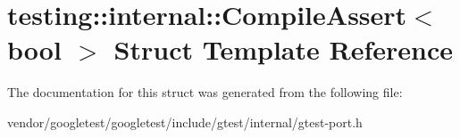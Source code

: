 \hypertarget{structtesting_1_1internal_1_1_compile_assert}{}\section{testing\+:\+:internal\+:\+:Compile\+Assert$<$ bool $>$ Struct Template Reference}
\label{structtesting_1_1internal_1_1_compile_assert}


The documentation for this struct was generated from the following file\+:\begin{DoxyCompactItemize}
\item 
vendor/googletest/googletest/include/gtest/internal/gtest-\/port.\+h\end{DoxyCompactItemize}
